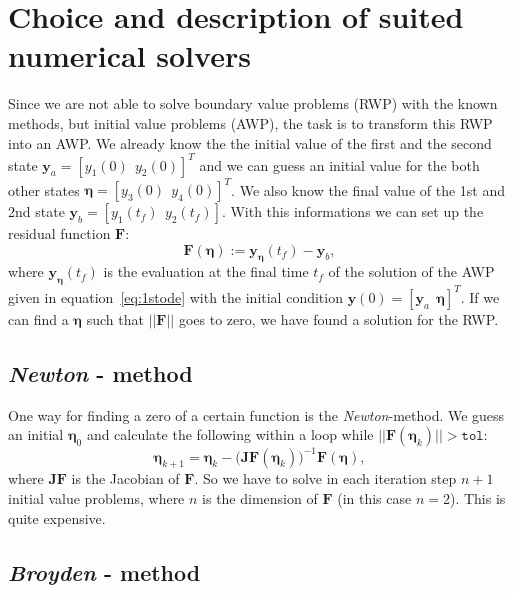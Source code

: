 \documentclass[11pt,a4paper,oneside]{scrartcl}
\begin{document}
\section{Choice and description of suited numerical solvers}

Since we are not able to solve boundary value problems (RWP) with the known methods, but 
initial value problems (AWP), the task is to transform this RWP into an AWP.
We already know the the initial value of the first and the second state $\boldsymbol{y}_a = [y_1(0)~~y_2(0)]^T$ and we can guess an initial value for the both other states $\boldsymbol{\eta} = [y_3(0)~~y_4(0)]^T$. We also know the final value of the 1st and 2nd state $\boldsymbol{y}_b = [y_1(t_{f})~~y_2(t_f)]$. With this informations we can set up the residual function $\boldsymbol{F}$: 
\begin{equation}
\boldsymbol{F}(\boldsymbol{\eta}) := \boldsymbol{y}_{\boldsymbol{\eta}}(t_f) - \boldsymbol{y}_b,
\label{eq:F:residuum}
\end{equation}
where $\boldsymbol{y}_{\boldsymbol{\eta}}(t_f)$ is the evaluation at the final time $t_f$ of the solution of the AWP given in equation~\ref{eq:1stode} with the initial condition $\boldsymbol{y}(0)=[\boldsymbol{y}_a ~~ \boldsymbol{\eta}]^T$. If we can find a $\boldsymbol{\eta}$ such that $||\boldsymbol{F}||$ goes to zero, we have found a solution for the RWP.

\subsection{\textit{Newton} - method}
One way for finding a zero of a certain function is the \textit{Newton}-method. We guess an initial $\boldsymbol{\eta}_0$ and calculate the following within a loop while $||\boldsymbol{F}(\boldsymbol{\eta}_k)|| > \texttt{tol}$:
\begin{equation}
\boldsymbol{\eta}_{k+1} = \boldsymbol{\eta}_k - \big( \boldsymbol{JF}(\boldsymbol{\eta}_k) \big)^{-1}\boldsymbol{F}(\boldsymbol{\eta}),
\label{eq:newtonMethod}
\end{equation}
where $\boldsymbol{JF}$ is the Jacobian of $\boldsymbol{F}$. So we have to solve in each iteration step $n+1$ initial value problems, where $n$ is the dimension of $\boldsymbol{F}$ (in this case $n=2$). This is quite expensive.

\subsection{\textit{Broyden} - method}
\end{document}

